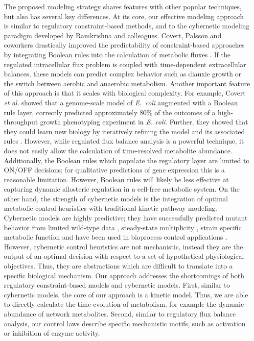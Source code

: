 \documentclass[12pt]{article}
\begin{document}
The proposed modeling strategy shares features with other popular techniques, but also has several key differences. 
At its core, our effective modeling approach is similar to regulatory constraint-based methods, and to the cybernetic modeling paradigm developed by Ramkrishna and colleagues.
Covert, Palsson and coworkers drastically improved the predictability of constraint-based approaches by integrating Boolean rules into the calculation of metabolic fluxes \citep{Covert:2001aa}.
If the regulated intracellular flux problem is coupled with time-dependent extracellular balances, these models can predict complex behavior such as diauxie growth or the switch between 
aerobic and anaerobic metabolism. Another important feature of this approach is that it scales with biological complexity. 
For example, Covert \emph{et al.} showed that a genome-scale model of \emph{E.~coli} augmented with a Boolean rule layer, 
correctly predicted approximately 80\% of the outcomes of a high-throughput growth phenotyping experiment in \emph{E. coli}.
Further, they showed that they could learn new biology by iteratively refining the model and its associated rules \citep{Covert:2004aa}. 
However, while regulated flux balance analysis is a powerful technique, it does not easily allow the calculation of time-resolved metabolite abundance. 
Additionally, the Boolean rules which populate the regulatory layer are limited to ON/OFF decisions; for qualitative predictions of gene expression this is a reasonable limitation. 
However, Boolean rules will likely be less effective at capturing dynamic allosteric regulation in a cell-free metabolic system. 
On the other hand, the strength of cybernetic models is the integration of optimal metabolic control heuristics with traditional kinetic pathway modeling. 
Cybernetic models are highly predictive; they have successfully predicted mutant behavior from limited wild-type data \citep{1999_varner_ramkrishna_MetaEng,Varner:2000aa,Song:2012aa}, 
steady-state multiplicity \citep{2012_kim_ramkrishna_BiotechProg}, strain specific metabolic function \citep{Song:2011aa} and have been used in bioprocess control applications \citep{Gadkar:2003aa}.
However, cybernetic control heuristics are not mechanistic, instead they are the output of an optimal decision with respect to a set of hypothetical physiological objectives. 
Thus, they are abstractions which are difficult to translate into a specific biological mechanism. 
Our approach addresses the shortcomings of both regulatory constraint-based models and cybernetic models. 
First, similar to cybernetic models, the core of our approach is a kinetic model. Thus, we are able to directly calculate the time evolution of metabolism, for example the dynamic abundance of network metabolites. Second, similar to regulatory flux balance analysis, our control laws describe specific mechanistic motifs, such as activation or inhibition of enzyme activity. 
\end{document}

